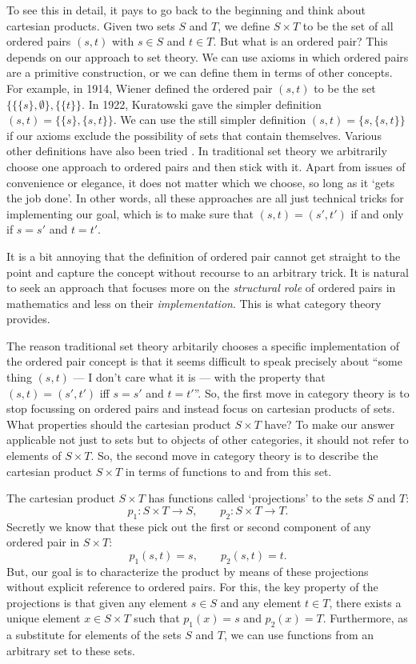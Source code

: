 \documentclass[12pt]{article}
\renewcommand{\to}{\rightarrow}
\newcommand{\maps}{\colon}
\begin{document}
To see this in detail, it pays to go back to the beginning and think
about cartesian products.  Given two sets $S$ and $T$, we define $S
\times T$ to be the set of all ordered pairs $(s,t)$ with $s \in S$
and $t \in T$.  But what is an ordered pair?  This depends on our
approach to set theory.  We can use axioms in which ordered pairs are
a primitive construction, or we can define them in terms of other
concepts.  For example, in 1914, Wiener defined the ordered pair
$(s,t)$ to be the set $\{ \{ \{s\}, \emptyset \}, \{ \{t\} \}$.  In
1922, Kuratowski gave the simpler definition $(s,t) =
\{ \{s\}, \{s,t\} \}$.  We can use the still simpler definition 
$(s,t) = \{s,\{s,t\}\}$ if our axioms exclude the possibility of sets
that contain themselves.  Various other definitions have also been
tried \cite{Kanamori}.  In traditional set theory we arbitrarily
choose one approach to ordered pairs and then stick with it.  Apart
from issues of convenience or elegance, it does not matter which we
choose, so long as it `gets the job done'.  In other words, all these
approaches are all just technical tricks for implementing our goal, which
is to make sure that $(s,t) = (s',t')$ if and only if $s = s'$ and $t = t'$.

It is a bit annoying that the definition of ordered pair cannot get
straight to the point and capture the concept without recourse to an
arbitrary trick.  It is natural to seek an approach that focuses more
on the {\it structural role} of ordered pairs in mathematics and less
on their {\it implementation}.  This is what category theory provides.

The reason traditional set theory arbitarily chooses a specific
implementation of the ordered pair concept is that it seems difficult
to speak precisely about ``some thing $(s,t)$ --- I don't care what it
is --- with the property that $(s,t) = (s',t')$ iff $s = s'$ and $t =
t'$''.  So, the first move in category theory is to stop focussing on
ordered pairs and instead focus on cartesian products of sets.  What
properties should the cartesian product $S \times T$ have?  To make
our answer applicable not just to sets but to objects of other
categories, it should not refer to elements of $S \times T$.  So, the
second move in category theory is to describe the cartesian product $S
\times T$ in terms of functions to and from this set.

The cartesian product $S \times T$ has 
functions called `projections' to the sets $S$ and $T$:
\[           p_1 \maps S \times T \to S , \qquad
           p_2 \maps S \times T \to T .\]
Secretly we know that these pick out the first or second 
component of any ordered pair in $S \times T$:
\[          p_1(s,t) = s, \qquad p_2(s,t) = t  .\]
But, our goal is to characterize the product by means of these
projections without explicit reference to ordered pairs.  For this,
the key property of the projections is that given any element $s \in
S$ and any element $t \in T$, there exists a unique element $x \in S
\times T$ such that $p_1(x) = s$ and $p_2(x) = T$.  Furthermore, as a
substitute for elements of the sets $S$ and $T$, we can use functions
from an arbitrary set to these sets.
\end{document}
